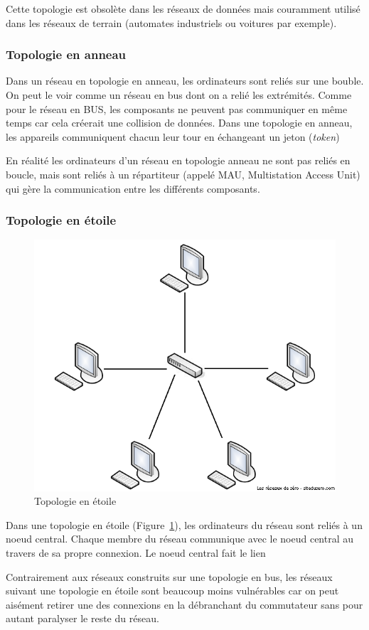 Cette topologie est obsolète dans les réseaux de données mais couramment utilisé dans les réseaux de terrain (automates industriels ou voitures par exemple).

\subsubsection{Topologie en anneau}

Dans un réseau en topologie en anneau, les ordinateurs sont reliés sur une bouble. On peut le voir comme un réseau en bus dont on a relié les extrémités. Comme pour le réseau en BUS, les composants ne peuvent pas communiquer en même temps car cela créerait une collision de données. Dans une topologie en anneau, les appareils communiquent chacun leur tour en échangeant un jeton (\textit{token})

En réalité les ordinateurs d'un réseau en topologie anneau ne sont pas reliés en boucle, mais sont reliés à un répartiteur (appelé MAU, Multistation Access Unit) qui gère la communication entre les différents composants.

\subsubsection{Topologie en étoile}
\begin{figure}[h!]
  \centering
  \includegraphics[width=.4\textwidth]{images/topologies/topologieEtoile}
  \caption{Topologie en étoile}
  \label{fig:topoEtoile}
\end{figure}
Dans une topologie en étoile (Figure~\ref{fig:topoEtoile}), les ordinateurs du réseau sont reliés à un noeud central. Chaque membre du réseau communique avec le noeud central au travers de sa propre connexion. Le noeud central fait le lien

Contrairement aux réseaux construits sur une topologie en bus, les réseaux suivant une topologie en étoile sont beaucoup moins vulnérables car on peut aisément retirer une des connexions en la débranchant du commutateur sans pour autant paralyser le reste du réseau.

